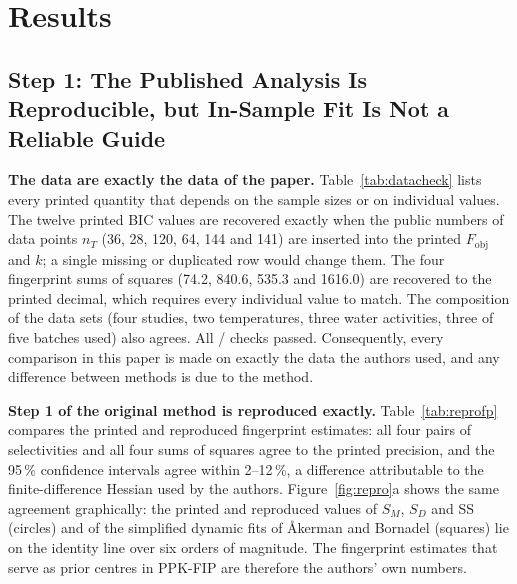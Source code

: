 \section{Results}
\subsection{Step 1: The Published Analysis Is Reproducible, but In-Sample Fit Is Not a Reliable Guide}\label{sec:repro}
\textbf{The data are exactly the data of the paper.} Table~\ref{tab:datacheck} lists every printed quantity that depends on the sample sizes or on individual values. The twelve printed BIC values are recovered exactly when the public numbers of data points $n_T$ (36, 28, 120, 64, 144 and 141) are inserted into the printed $F_\mathrm{obj}$ and $k$; a single missing or duplicated row would change them. The four fingerprint sums of squares (74.2, 840.6, 535.3 and 1616.0) are recovered to the printed decimal, which requires every individual value to match. The composition of the data sets (four studies, two temperatures, three water activities, three of five batches used) also agrees. All \NCheckPass{}/\NCheckAll{} checks passed. Consequently, every comparison in this paper is made on exactly the data the authors used, and any difference between methods is due to the method.

\textbf{Step 1 of the original method is reproduced exactly.} Table~\ref{tab:reprofp} compares the printed and reproduced fingerprint estimates: all four pairs of selectivities and all four sums of squares agree to the printed precision, and the 95\,\% confidence intervals agree within 2--12\,\%, a difference attributable to the finite-difference Hessian used by the authors. Figure~\ref{fig:repro}a shows the same agreement graphically: the printed and reproduced values of $S_M$, $S_D$ and SS (circles) and of the simplified dynamic fits of Åkerman and Bornadel (squares) lie on the identity line over six orders of magnitude. The fingerprint estimates that serve as prior centres in PPK-FIP are therefore the authors' own numbers.

